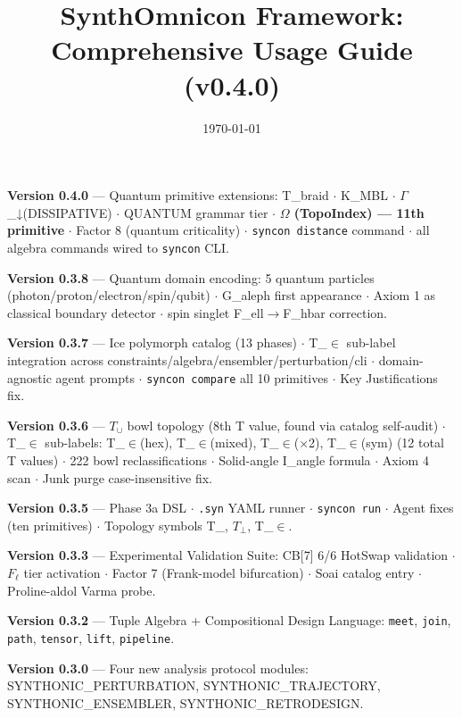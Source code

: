 \documentclass[12pt,a4paper]{article}
\begin{document}
\title{SynthOmnicon Framework: Comprehensive Usage Guide (v0.4.0)}
\date{\today}

\maketitle

\textbf{Version 0.4.0} --- Quantum primitive extensions: T\_braid $\cdot$ K\_MBL $\cdot$ $\Gamma$\_↓(DISSIPATIVE) $\cdot$ QUANTUM grammar tier $\cdot$ \textbf{$\Omega$ (TopoIndex) --- 11th primitive} $\cdot$ Factor 8 (quantum criticality) $\cdot$ \texttt{syncon distance} command $\cdot$ all algebra commands wired to \texttt{syncon} CLI.

\textbf{Version 0.3.8} --- Quantum domain encoding: 5 quantum particles (photon/proton/electron/spin/qubit) $\cdot$ G\_aleph first appearance $\cdot$ Axiom 1 as classical boundary detector $\cdot$ spin singlet F\_ell$\rightarrow$F\_hbar correction.

\textbf{Version 0.3.7} --- Ice polymorph catalog (13 phases) $\cdot$ T\_$\in$ sub-label integration across constraints/algebra/ensembler/perturbation/cli $\cdot$ domain-agnostic agent prompts $\cdot$ \texttt{syncon compare} all 10 primitives $\cdot$ Key Justifications fix.

\textbf{Version 0.3.6} --- $T_{\cup}$ bowl topology (8th T value, found via catalog self-audit) $\cdot$ T\_$\in$ sub-labels: T\_$\in$(hex), T\_$\in$(mixed), T\_$\in$($\times$2), T\_$\in$(sym) (12 total T values) $\cdot$ 222 bowl reclassifications $\cdot$ Solid-angle I\_angle formula $\cdot$ Axiom 4 scan $\cdot$ Junk purge case-insensitive fix.

\textbf{Version 0.3.5} --- Phase 3a DSL $\cdot$ \texttt{.syn} YAML runner $\cdot$ \texttt{syncon run} $\cdot$ Agent fixes (ten primitives) $\cdot$ Topology symbols T\_\textbar{}, $T_{\perp}$, T\_$\in$.

\textbf{Version 0.3.3} --- Experimental Validation Suite: CB{[}7{]} 6/6 HotSwap validation $\cdot$ $F_{\ell}$ tier activation $\cdot$ Factor 7 (Frank-model bifurcation) $\cdot$ Soai catalog entry $\cdot$ Proline-aldol Varma probe.

\textbf{Version 0.3.2} --- Tuple Algebra + Compositional Design Language: \texttt{meet}, \texttt{join}, \texttt{path}, \texttt{tensor}, \texttt{lift}, \texttt{pipeline}.

\textbf{Version 0.3.0} --- Four new analysis protocol modules: SYNTHONIC\_PERTURBATION, SYNTHONIC\_TRAJECTORY, SYNTHONIC\_ENSEMBLER, SYNTHONIC\_RETRODESIGN.
\end{document}
